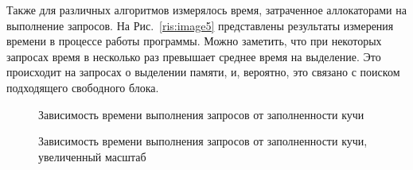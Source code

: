    Также для различных алгоритмов измерялось время, затраченное аллокаторами на выполнение запросов. На Рис.~\ref{ris:image5} представлены 
результаты измерения времени в процессе работы программы. Можно заметить, что при некоторых запросах время в несколько раз превышает 
среднее время на выделение. Это происходит на запросах о выделении памяти, и, вероятно, это связано с поиском подходящего свободного блока. 
   
   \begin{figure}[p]
   \caption{Зависимость времени выполнения запросов от заполненности кучи}
   \label{ris:image6}
   \end{figure}
   
   \begin{figure}[p]
   \caption{Зависимость времени выполнения запросов от заполненности кучи, увеличенный масштаб}
   \label{ris:image7}
   \end{figure}
   
